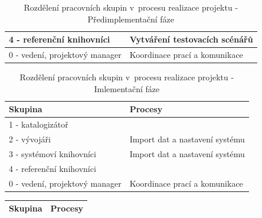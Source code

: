 \documentclass[
	11pt, oneside, printed, final, palatino, monochrome
	microtype,
	table,   %
	lof,     %
	lot     %
]{fithesis3}
\newcommand{\bold}[1]{\textbf{#1}}
\begin{document}
{\begin{table}[H]
\begin{tabular}{| p{3cm} | p{8.3cm} |}
	4 - referenční knihovníci
    & 
    Vytváření testovacích scénářů
    \\ \hline
    
	0 - vedení, projektový manager
    & 
    Koordinace prací a komunikace
    \\ \hline
    
    \end{tabular}
    \caption{Rozdělení pracovních skupin v~procesu realizace projektu - Předimplementační fáze}
\end{table}
    
\begin{table}[H]
    \centering
    \begin{tabular}{| p{3cm} | p{8.3cm} |}
    \hline
    \bold{Skupina} 	
    & 
    \bold{Procesy} 
    \\ \hline
    
	1 - katalogizátoř
    & 
    
    \\ \hline
    
	2 - vývojáři
    & 
    Import dat a nastavení systému
    \\ \hline
    
	3 - systémoví knihovníci
    & 
    Import dat a nastavení systému
    \\ \hline
    
	4 - referenční knihovníci
    & 
    
    \\ \hline
    
	0 - vedení, projektový manager
    & 
    Koordinace prací a komunikace
    \\ \hline
    
    \end{tabular}
    \caption{Rozdělení pracovních skupin v~procesu realizace projektu - Imlementační fáze}
\end{table}

\begin{table}[H]
    \centering
    \begin{tabular}{| p{3cm} | p{8.3cm} |}
    \hline
    \bold{Skupina} 	
    & 
    \bold{Procesy} 
    \\ \hline
    

\end{tabular}
\end{table}}
\end{document}

